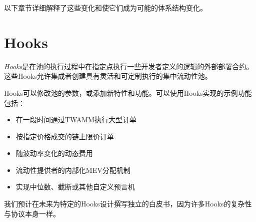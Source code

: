 \documentclass[sigconf,nonacm,prologue,table]{acmart}
\numberwithin{equation}{section}
\theoremstyle{definition}
\theoremstyle{remark}
\begin{document}
以下章节详细解释了这些变化和使它们成为可能的体系结构变化。

\section{Hooks} 
\label{sec:Hooks}

\emph{Hooks}是在池的执行过程中在指定点执行一些开发者定义的逻辑的外部部署合约。这些Hooks允许集成者创建具有灵活和可定制执行的集中流动性池。

Hooks可以修改池的参数，或添加新特性和功能。可以使用Hooks实现的示例功能包括：
\begin{itemize}
\item 在一段时间通过TWAMM执行大型订单
\item 按指定价格成交的链上限价订单
\item 随波动率变化的动态费用
\item 流动性提供者的内部化MEV分配机制
\item 实现中位数、截断或其他自定义预言机
\end{itemize}

我们预计在未来为特定的Hooks设计撰写独立的白皮书，因为许多Hooks的复杂性与协议本身一样。
\end{document}
